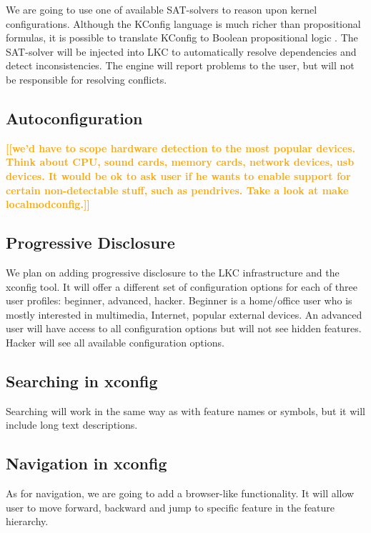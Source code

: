 \documentclass{chi2009}
\newcommand{\todo}[1]{\textsf{\textbf{\textcolor{Orange}{[[#1]]}}}}
\begin{document}
We are going to use one of available SAT-solvers to reason upon kernel configurations. Although the KConfig language is much richer than propositional formulas, it is possible to translate KConfig to Boolean propositional logic \cite{she:kconfig:2010}. The SAT-solver will be injected into LKC to automatically resolve dependencies and detect inconsistencies. The engine will report problems to the user, but will not be responsible for resolving conflicts.

\subsection{Autoconfiguration}

\todo{we'd have to scope hardware detection to the most popular devices. Think about CPU, sound cards, memory cards, network devices, usb devices. It would be ok to ask user if he wants to enable support for certain non-detectable stuff, such as pendrives. Take a look at make localmodconfig.}

\subsection{Progressive Disclosure}

We plan on adding progressive disclosure to the LKC infrastructure and the xconfig tool. It will offer a different set of configuration options for each of three user profiles: beginner, advanced, hacker. Beginner is a home/office user who is mostly interested in multimedia, Internet, popular external devices. An advanced user will have access to all configuration options but will not see hidden features. Hacker will see all available configuration options.

\subsection{Searching in xconfig}

Searching will work in the same way as with feature names or symbols, but it will include long text descriptions.

\subsection{Navigation in xconfig}

As for navigation, we are going to add a browser-like functionality. It will allow user to move forward, backward and jump to specific feature in the feature hierarchy.
\end{document}
